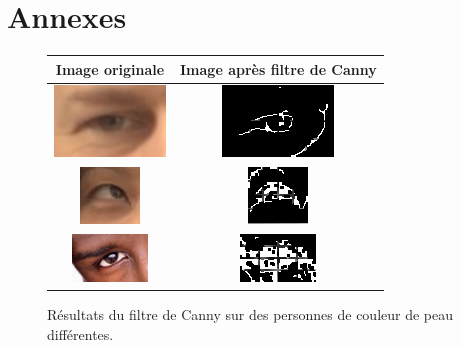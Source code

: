 \section{Annexes}

\renewcommand{\figurename}{Annexe}
\captionsetup{list=no}

\setcounter{figure}{0}

\begin{figure}[H]
  \center
  \begin{tabular}{|c|c|}
    \hline
    Image originale & Image après filtre de Canny\\
    \hline
    \includegraphics{image/original.png} & \includegraphics{image/canny_final.png}\\
    \hline
    \includegraphics{image/original_asiatique.png} & \includegraphics{image/cannyAsiatique.png}\\
    \hline
    \includegraphics{image/original_black.png} & \includegraphics{image/cannyBlack.png}\\
    \hline
  \end{tabular}
  \caption{Résultats du filtre de Canny sur des personnes de couleur de peau différentes.}
\end{figure}

